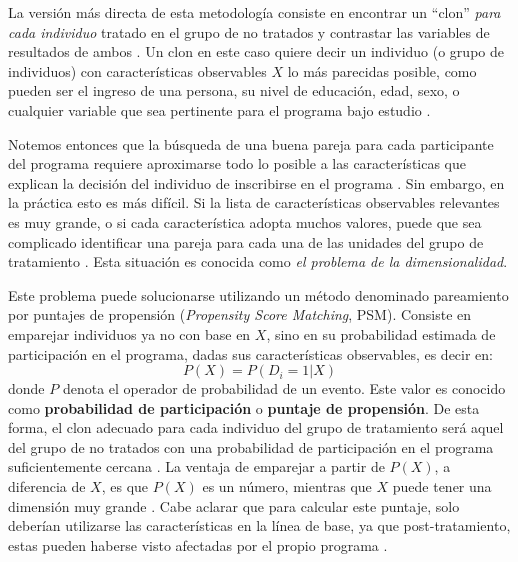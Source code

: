 \documentclass[../../main.tex]{subfiles}
\begin{document}
La versión más directa de esta metodología consiste en encontrar un ``clon'' \textit{para cada individuo} tratado en el grupo de no tratados y contrastar las variables de resultados de ambos \cite{bernal}. Un clon en este caso quiere decir un individuo (o grupo de individuos) con características observables \(X\) lo más parecidas posible, como pueden ser el ingreso de una persona, su nivel de educación, edad, sexo, o cualquier variable que sea pertinente para el programa bajo estudio \cite{bernal}. 

Notemos entonces que la búsqueda de una buena pareja para cada participante del programa requiere aproximarse todo lo posible a las características que explican la decisión del individuo de inscribirse en el programa \cite{gertler-2016}. Sin embargo, en la práctica esto es más difícil. Si la lista de características observables relevantes es muy grande, o si cada característica adopta muchos valores, puede que sea complicado identificar una pareja para cada una de las unidades del grupo de tratamiento \cite{gertler-2016}. Esta situación es conocida como \textit{el problema de la dimensionalidad}.

Este problema puede solucionarse utilizando un método denominado pareamiento por puntajes de propensión (\textit{Propensity Score Matching}, PSM). Consiste en emparejar individuos ya no con base en \(X\), sino en su probabilidad estimada de participación en el programa, dadas sus características observables, es decir en:
\[P(X) = P(D_i = 1|X)\]
donde \(P\) denota el operador de probabilidad de un evento. Este valor es conocido como \textbf{probabilidad de participación} o \textbf{puntaje de propensión}. De esta forma, el clon adecuado para cada individuo del grupo de tratamiento será aquel del grupo de no tratados con una probabilidad de participación en el programa suficientemente cercana \cite{bernal}. La ventaja de emparejar a partir de \(P(X)\), a diferencia de \(X\), es que \(P(X)\) es un número, mientras que \(X\) puede tener una dimensión muy grande \cite{bernal}. Cabe aclarar que para calcular este puntaje, solo deberían utilizarse las características en la línea de base, ya que post-tratamiento, estas pueden haberse visto afectadas por el propio programa \cite{gertler-2016}.

\end{document}
